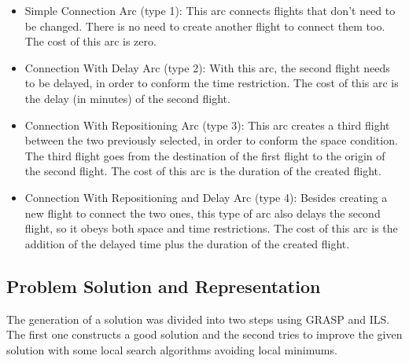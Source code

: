\documentclass{endm}
\begin{document}
\begin{itemize}

\item Simple Connection Arc (type 1): This arc connects flights that don’t need to be changed. There is no need to create another flight to connect them too. The cost of this arc is zero.

\item Connection With Delay Arc (type 2): With this arc, the second flight needs to be delayed, in order to conform the time restriction. The cost of this arc is the delay (in minutes) of the second flight.

\item Connection With Repositioning Arc (type 3): This arc creates a third flight between the two previously selected, in order to conform the space condition. The third flight goes from the destination of the first flight to the origin of the second flight. The cost of this arc is the duration of the created flight.

\item Connection With Repositioning and Delay Arc (type 4): Besides creating a new flight to connect the two ones, this type of arc also delays the second flight, so it obeys both space and time restrictions. The cost of this arc is the addition of the delayed time plus the duration of the created flight.
\end{itemize}

\subsection{Problem Solution and Representation}

The generation of a solution was divided into two steps using GRASP and ILS. The first one constructs a good solution and the second tries to improve the given solution with some local search algorithms avoiding local minimums.


\end{document}
